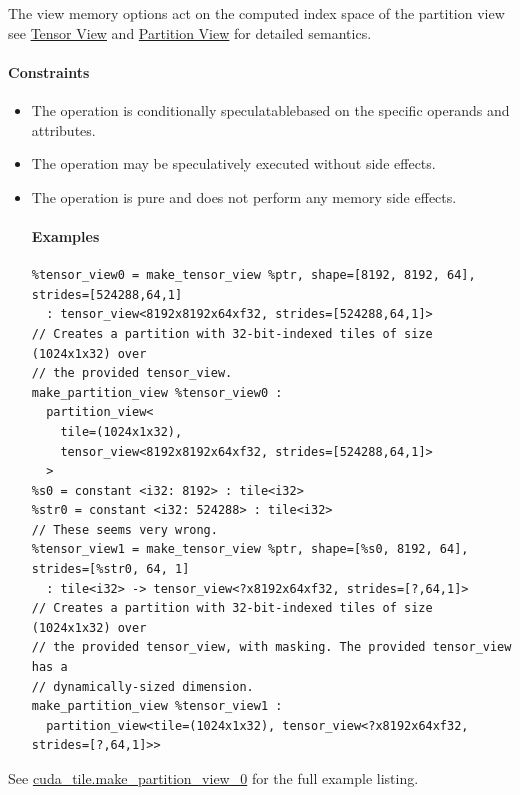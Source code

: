 \documentclass{article}
\begin{document}
The view memory options act on the computed index space of the partition view see \href{https://docs.nvidia.com/cuda/tile-ir/latest/sections/types.html#type-tensor-view}{Tensor View} and \href{https://docs.nvidia.com/cuda/tile-ir/latest/sections/types.html#type-partition-view}{Partition View} for detailed semantics.



\paragraph{Constraints}

\begin{itemize}
\item The operation is conditionally speculatablebased on the specific operands and attributes.
\item The operation may be speculatively executed without side effects.
\item The operation is pure and does not perform any memory side effects.


\paragraph{Examples}

\begin{lstlisting}
%tensor_view0 = make_tensor_view %ptr, shape=[8192, 8192, 64], strides=[524288,64,1]
  : tensor_view<8192x8192x64xf32, strides=[524288,64,1]>
// Creates a partition with 32-bit-indexed tiles of size (1024x1x32) over
// the provided tensor_view.
make_partition_view %tensor_view0 :
  partition_view<
    tile=(1024x1x32),
    tensor_view<8192x8192x64xf32, strides=[524288,64,1]>
  >
%s0 = constant <i32: 8192> : tile<i32>
%str0 = constant <i32: 524288> : tile<i32>
// These seems very wrong.
%tensor_view1 = make_tensor_view %ptr, shape=[%s0, 8192, 64], strides=[%str0, 64, 1]
  : tile<i32> -> tensor_view<?x8192x64xf32, strides=[?,64,1]>
// Creates a partition with 32-bit-indexed tiles of size (1024x1x32) over
// the provided tensor_view, with masking. The provided tensor_view has a
// dynamically-sized dimension.
make_partition_view %tensor_view1 :
  partition_view<tile=(1024x1x32), tensor_view<?x8192x64xf32, strides=[?,64,1]>>
\end{lstlisting}

\end{itemize}
See \href{https://docs.nvidia.com/cuda/tile-ir/latest/sections/appendix.html#example-cuda-tile-make-partition-view-0}{cuda\_tile.make\_partition\_view\_0} for the full example listing.
\end{document}
